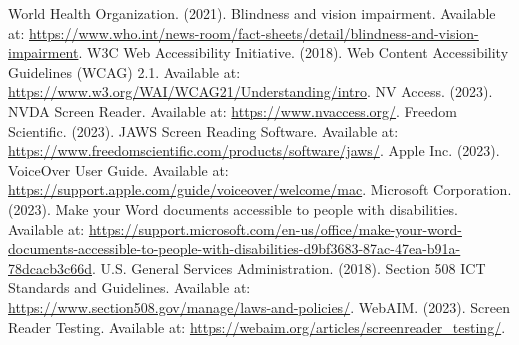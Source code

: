 \begin{thebibliography}{99}
 World Health Organization. (2021). Blindness and vision impairment. Available at: \url{https://www.who.int/news-room/fact-sheets/detail/blindness-and-vision-impairment}.
 W3C Web Accessibility Initiative. (2018). Web Content Accessibility Guidelines (WCAG) 2.1. Available at: \url{https://www.w3.org/WAI/WCAG21/Understanding/intro}.
 NV Access. (2023). NVDA Screen Reader. Available at: \url{https://www.nvaccess.org/}.
 Freedom Scientific. (2023). JAWS Screen Reading Software. Available at: \url{https://www.freedomscientific.com/products/software/jaws/}.
 Apple Inc. (2023). VoiceOver User Guide. Available at: \url{https://support.apple.com/guide/voiceover/welcome/mac}.
 Microsoft Corporation. (2023). Make your Word documents accessible to people with disabilities. Available at: \url{https://support.microsoft.com/en-us/office/make-your-word-documents-accessible-to-people-with-disabilities-d9bf3683-87ac-47ea-b91a-78dcacb3c66d}.
 U.S. General Services Administration. (2018). Section 508 ICT Standards and Guidelines. Available at: \url{https://www.section508.gov/manage/laws-and-policies/}.
 WebAIM. (2023). Screen Reader Testing. Available at: \url{https://webaim.org/articles/screenreader_testing/}.
\end{thebibliography}

